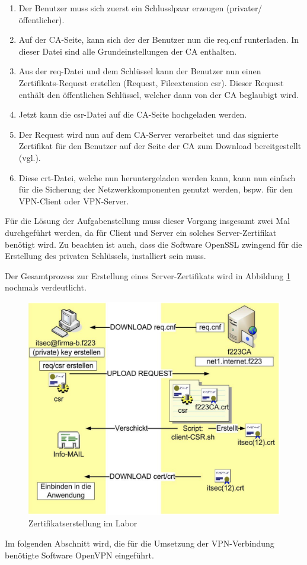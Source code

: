 \documentclass[
a4paper,     %
 headsepline, %
footsepline, %
titlepage,   %
 halfparskip,     %
 fleqn,       %
12pt         %
]{scrartcl}  %
\begin{document}
\begin{enumerate}
\item Der Benutzer muss sich zuerst ein Schlusslpaar erzeugen (privater/öffentlicher)\cite{JueNeuSaDue}.
\item Auf der CA-Seite, kann sich der der Benutzer nun die req.cnf runterladen. In dieser Datei sind alle Grundeinstellungen der CA enthalten\cite{JueNeuSaDue}. 
\item Aus der req-Datei und dem Schlüssel kann der Benutzer nun einen Zertifikats-Request erstellen (Request, Fileextension csr). Dieser Request enthält den öffentlichen Schlüssel, welcher dann von der CA beglaubigt wird\cite{JueNeuSaDue}. 
\item Jetzt kann die csr-Datei auf die CA-Seite hochgeladen werden\cite{JueNeuSaDue}. 
\item Der Request wird nun auf dem CA-Server verarbeitet und das signierte Zertifikat für den Benutzer auf der Seite der CA zum Download bereitgestellt (vgl.\cite{JueNeuSaDue}). 
\item Diese crt-Datei, welche nun heruntergeladen werden kann, kann nun einfach für die Sicherung der Netzwerkkomponenten genutzt werden, bspw. für den VPN-Client oder VPN-Server\cite{JueNeuSaDue}.  
\end{enumerate}

Für die Lösung der Aufgabenstellung muss dieser Vorgang insgesamt zwei Mal durchgeführt werden, da für Client und Server ein solches Server-Zertifikat benötigt wird. Zu beachten ist auch, dass die Software OpenSSL zwingend für die Erstellung des privaten Schlüssels, installiert sein muss.

Der Gesamtprozess zur Erstellung eines Server-Zertifikats wird in Abbildung \ref{fig:Zertifikaserstellung} nochmals verdeutlicht.  
\begin{figure}[!h]
	\includegraphics[width=\textwidth]{pictures/Zertifikatserstellung.png}
	\caption{Zertifikatserstellung im Labor\cite{JueNeuSaDue}}
	\label{fig:Zertifikaserstellung}
\end{figure}
\newpage
Im folgenden Abschnitt wird, die für die Umsetzung der VPN-Verbindung benötigte Software OpenVPN eingeführt. 
\newpage
\end{document}
